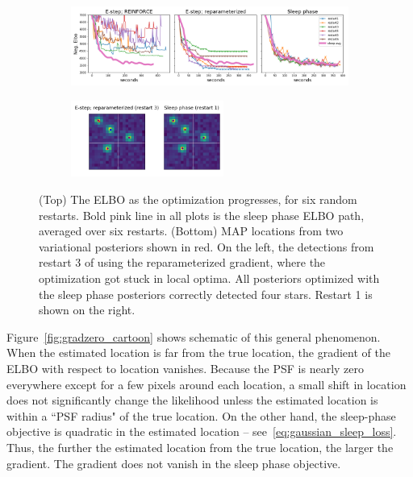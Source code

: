 \begin{figure}[!htb]
    \centering
    \begin{subfigure}[t]{0.9\textwidth}
    \centering
    \includegraphics[width=\textwidth]{figures/optim_path_compare.png}
    \end{subfigure}
    \begin{subfigure}[t]{\textwidth}
    \centering
    \includegraphics[width=0.55\textwidth]{figures/optim_path_detect_compare.png}
    \end{subfigure}
    \vspace{-3em}
    \caption{(Top) The ELBO as the optimization progresses, for six random restarts. Bold pink line in all plots is the sleep phase ELBO path, averaged over six restarts. (Bottom) MAP locations from two variational posteriors shown in red. On the left, the detections from restart 3 of using the reparameterized gradient, where the optimization got stuck in local optima. All posteriors optimized with the sleep phase posteriors correctly detected four stars. Restart 1 is shown on the right. }
    \label{fig:optim_path}
\end{figure}

Figure~\ref{fig:gradzero_cartoon} shows schematic of this general phenomenon. When the estimated location is far from the true location, the gradient of the ELBO with respect to location vanishes. Because the PSF is nearly zero everywhere except for a few pixels around each location, a small shift in location does not significantly change the likelihood unless the estimated location is within a ``PSF radius" of the true location. On the other hand, the sleep-phase objective is quadratic in the estimated location -- see~\eqref{eq:gaussian_sleep_loss}. Thus, the further the estimated location from the true location, the larger the gradient. The gradient does not vanish in the sleep phase objective. 

